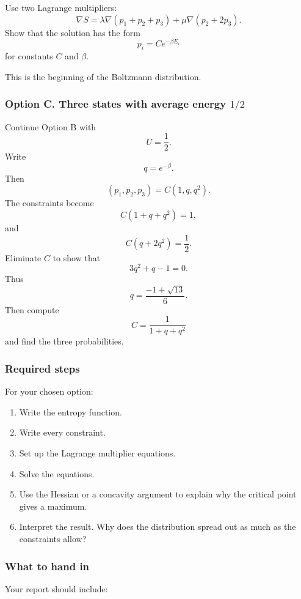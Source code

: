 Use two Lagrange multipliers:
\[
    \nabla S=\lambda\nabla(p_1+p_2+p_3)+\mu\nabla(p_2+2p_3).
\]
Show that the solution has the form
\[
\boxed{
    p_i=C e^{-\beta E_i}
}
\]
for constants \(C\) and \(\beta\).

This is the beginning of the Boltzmann distribution.

\subsubsection*{Option C. Three states with average energy \(1/2\)}

Continue Option B with
\[
    U=\frac12.
\]
Write
\[
    q=e^{-\beta}.
\]
Then
\[
    (p_1,p_2,p_3)
    =
    C(1,q,q^2).
\]
The constraints become
\[
    C(1+q+q^2)=1,
\]
and
\[
    C(q+2q^2)=\frac12.
\]
Eliminate \(C\) to show that
\[
    3q^2+q-1=0.
\]
Thus
\[
\boxed{
    q=\frac{-1+\sqrt{13}}{6}.
}
\]
Then compute
\[
    C=\frac{1}{1+q+q^2}
\]
and find the three probabilities.

\subsubsection*{Required steps}

For your chosen option:

\begin{enumerate}
\item Write the entropy function.

\item Write every constraint.

\item Set up the Lagrange multiplier equations.

\item Solve the equations.

\item Use the Hessian or a concavity argument to explain why the critical point gives a
maximum.

\item Interpret the result.  Why does the distribution spread out as much as the
constraints allow?
\end{enumerate}

\subsubsection*{What to hand in}

Your report should include:

